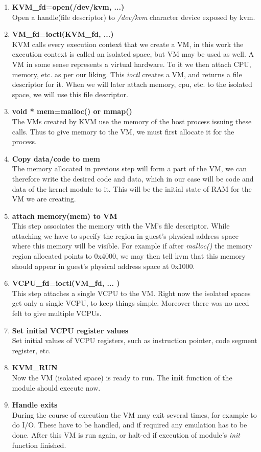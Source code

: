 \documentclass[twoside]{iitbreport}
\begin{document}
\begin{enumerate}
\begin{enumerate}
\item \textbf{KVM\_fd=open(/dev/kvm, ...)}\\
Open a handle(file descriptor) to \textit{/dev/kvm} character device exposed by kvm.
\item \textbf{VM\_fd=ioctl(KVM\_fd, ...)}\\
KVM calls every execution context that we create a VM, in this work the execution context is called an isolated space, but VM may be used as well. A VM in some sense represents a virtual hardware. To it we then attach CPU, memory, etc. as per our liking. This \textit{ioctl} creates a VM, and returns a file descriptor for it.
When we will later attach memory, cpu, etc. to the isolated space, we will use this file descriptor.
\item \textbf{void * mem=malloc() or mmap()}\\
The VMs created by KVM use the memory of the host process issuing these calls. Thus to give memory to the VM, we must first allocate it for the process.
\item \textbf{Copy data/code to mem}\\
The memory allocated in previous step will form a part of the VM, we can therefore write the desired code and data, which in our case will be code and data of the kernel module to it. This will be the initial state of RAM for the VM we are creating.
\item \textbf{attach memory(mem) to VM}\\
This step associates the memory with the VM's file descriptor. While attaching we have to specify the region in guest's physical address space where this memory will be visible. For example if after \textit{malloc()} the memory region allocated points to 0x4000, we may then tell kvm that this memory should appear in guest's physical address space at 0x1000.
\item \textbf{VCPU\_fd=ioctl(VM\_fd, ... )}\\
This step attaches a single VCPU to the VM. Right now the isolated spaces get only a single VCPU, to keep things simple. Moreover there was no need felt to give multiple VCPUs.
\item \textbf{Set initial VCPU register values}\\
Set initial values of VCPU registers, such as instruction pointer, code segment register, etc.
\item \textbf{KVM\_RUN}\\
Now the VM (isolated space) is ready to run. The \textbf{init} function of the module should execute now.
\item \textbf{Handle exits}\\
During the course of execution the VM may exit several times, for example to do I/O. These have to be handled, and if required any emulation has to be done. After this VM is run again, or halt-ed if execution of module's \textit{init} function finished.
\end{enumerate}


\end{enumerate}
\end{document}
